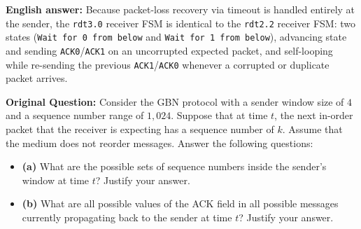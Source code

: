 \textbf{English answer:} Because packet-loss recovery via timeout is handled entirely at the sender, the \texttt{rdt3.0} receiver FSM is identical to the \texttt{rdt2.2} receiver FSM: two states (\texttt{Wait for 0 from below} and \texttt{Wait for 1 from below}), advancing state and sending \texttt{ACK0}/\texttt{ACK1} on an uncorrupted expected packet, and self-looping while re-sending the previous \texttt{ACK1}/\texttt{ACK0} whenever a corrupted or duplicate packet arrives.



\textbf{Original Question:} Consider the GBN protocol with a sender window size of $4$ and a sequence number range of $1{,}024$. Suppose that at time $t$, the next in-order packet that the receiver is expecting has a sequence number of $k$. Assume that the medium does not reorder messages. Answer the following questions:
\begin{itemize}
\item \textbf{(a)} What are the possible sets of sequence numbers inside the sender's window at time $t$? Justify your answer.
\item \textbf{(b)} What are all possible values of the ACK field in all possible messages currently propagating back to the sender at time $t$? Justify your answer.
\end{itemize}

